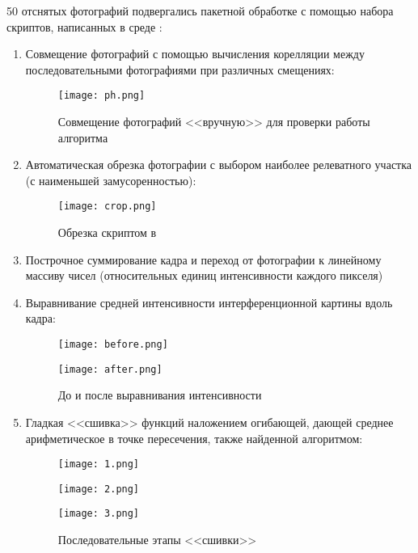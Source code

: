 \documentclass{urticle}
\begin{document}
  50 отснятых фотографий подвергались пакетной обработке с помощью набора скриптов, написанных в среде :
  \begin{enumerate}
  	\item Совмещение фотографий с помощью вычисления корелляции между последовательными фотографиями при различных смещениях:
  	\begin{figure}[H]
	\centering
  	\texttt{[image: ph.png]}
  \caption{Совмещение фотографий <<вручную>> для проверки работы алгоритма}
  \end{figure}
  
  	\item Автоматическая обрезка фотографии с выбором наиболее релеватного участка (с наименьшей замусоренностью):
  	
  	\begin{figure}[H]
	\centering
  	\texttt{[image: crop.png]}
  \caption{Обрезка скриптом в }
  \end{figure}
  
  \item Построчное суммирование кадра и переход от фотографии к линейному массиву чисел (относительных единиц интенсивности каждого пикселя)
  \item Выравнивание средней интенсивности интерференционной картины вдоль кадра:
  \begin{figure}[H]
  \centering
  	\begin{minipage}[t]{0.7\textwidth}
  		\texttt{[image: before.png]}
  	\end{minipage}
  	\centering
  	\begin{minipage}[t]{0.7\textwidth}
  		\texttt{[image: after.png]}
  	\end{minipage}
  	\caption{До и после выравнивания интенсивности}
  \end{figure}
  
  \item Гладкая <<сшивка>> функций наложением огибающей, дающей среднее арифметическое в точке пересечения, также найденной алгоритмом:
  
  \begin{figure}[H]
  \centering
  	\begin{minipage}[t]{0.7\textwidth}
  		\texttt{[image: 1.png]}
  	\end{minipage}
  	\centering
  	\begin{minipage}[t]{0.7\textwidth}
  		\texttt{[image: 2.png]}
  	\end{minipage}
  	\centering
  	\begin{minipage}[t]{0.7\textwidth}
  		\texttt{[image: 3.png]}
  	\end{minipage}
  	\caption{Последовательные этапы <<сшивки>>}
  \end{figure}
  \end{enumerate}
  
\end{document}
